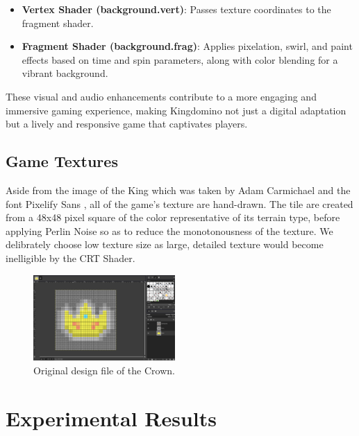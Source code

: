 \documentclass[conference]{IEEEtran}
\begin{document}
\begin{itemize}
    \item \textbf{Vertex Shader (background.vert)}: Passes texture coordinates to the fragment shader.
    \item \textbf{Fragment Shader (background.frag)}: Applies pixelation, swirl, and paint effects based on time and spin parameters, along with color blending for a vibrant background.
\end{itemize}

These visual and audio enhancements contribute to a more engaging and immersive
gaming experience, making Kingdomino not just a digital adaptation but a lively
and responsive game that captivates players.

\subsection{Game Textures}

Aside from the image of the King which was taken by Adam Carmichael
\cite{github:carmichael-repo} and the font Pixelify Sans
\cite{github:pixelify-sans}, all of the game's texture are hand-drawn. The tile
are created from a 48x48 pixel square of the color representative of its
terrain type, before applying Perlin Noise \cite{wiki:perlin-noise} so as to
reduce the monotonousness of the texture. We delibrately choose low texture
size as large, detailed texture would become inelligible by the CRT Shader.

\begin{figure}[htbp]
    \centerline{\includegraphics[width=0.48\textwidth]{assets/crown-design-file.png}}
    \caption{Original design file of the Crown.}\label{fig:crown-design}
\end{figure}

\section{Experimental Results}
\label{sec:experimental_results}
\end{document}
